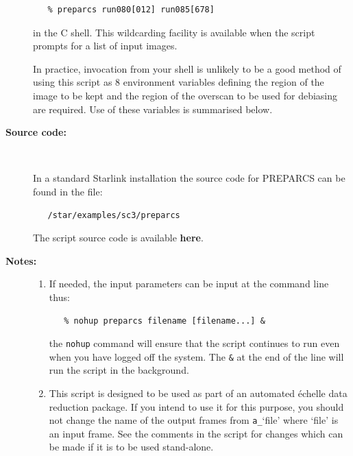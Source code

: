 \documentclass[twoside,11pt]{article}
\newcommand{\htmlref}[2]{#1}
\begin{document}
\begin{description}
\begin{verbatim}
   % preparcs run080[012] run085[678]
\end{verbatim}

     in the C shell.  This wildcarding facility is available when the
     script prompts for a list of input images.

     In practice, invocation from your shell is unlikely to be a good
     method of using this script as 8 environment variables defining
     the region of the image to be kept and the region of the overscan
     to be used for debiasing are required.  Use of these variables is
     summarised below.

\item [{\bf Source code:}] \mbox{} \\
\begin{latex}
In a standard Starlink installation the source code for PREPARCS can be found
in the file:
\begin{verbatim}
   /star/examples/sc3/preparcs
\end{verbatim}
\end{latex}
\begin{htmlonly}
      The script source code is available
      \htmlref{{\bf here}}{se_preparcs_source}.
\end{htmlonly}

\item [{\bf Notes:}] \mbox{}
\begin{enumerate}

\item If needed, the input parameters can be input at the command
      line thus:

\begin{verbatim}
   % nohup preparcs filename [filename...] &
\end{verbatim}

      the \verb+nohup+ command will ensure that the script continues
      to run even when you have logged off the system.  The \verb+&+ at
      the end of the line will run the script in the background.

\item This script is designed to be used as part of an automated
      \'{e}chelle data reduction package.  If you intend to use it
      for this purpose, you should not change the name of the output
      frames from \verb+a_+`file' where `file' is an input frame.  See the
      comments in the script for changes which can be made if it is
      to be used stand-alone.


\end{enumerate}
\end{description}
\end{document}

